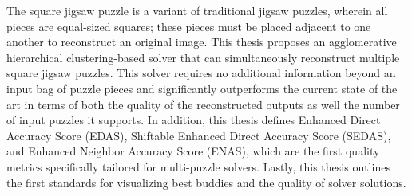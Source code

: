 The square jigsaw puzzle is a variant of traditional jigsaw puzzles, wherein all pieces are equal-sized squares; these pieces must be placed adjacent to one another to reconstruct an original image.  This thesis proposes an agglomerative hierarchical clustering-based solver that can simultaneously reconstruct multiple square jigsaw puzzles.  This solver requires no additional information beyond an input bag of puzzle pieces and significantly outperforms the current state of the art in terms of both the quality of the reconstructed outputs as well the number of input puzzles it supports.  In addition, this thesis defines Enhanced Direct Accuracy Score (EDAS), Shiftable Enhanced Direct Accuracy Score (SEDAS), and Enhanced Neighbor Accuracy Score (ENAS), which are the first quality metrics specifically tailored for multi-puzzle solvers.  Lastly, this thesis outlines the first  standards for visualizing best buddies and the quality of solver solutions. 
